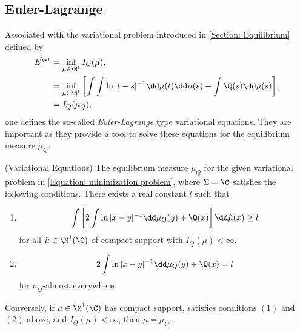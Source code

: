 \subsection{Euler-Lagrange}

Associated with the variational problem introduced in \autoref{Section: Equilibrium} defined by
\begin{align} \label{Equation: minimization problem}
	E^{\wf} & = \inf_{\mu \in \M^1} I_Q (\mu), \\
	& =   \inf_{\mu \in \M^1} \left[ \int \int \ln |t - s|^{-1} \dd \mu(t) \dd \mu(s) + \int \Q(s) \dd  \mu(s) \right], \\
	&  = I_Q (\mu_Q),
\end{align}
one defines the so-called \textit{Euler-Lagrange} type variational equations. They are important as they provide a tool to solve these equations for the equilibrium measure $\mu_Q$.

\begin{teorema} \label{Theorem: EL} (Variational Equations)
	The equilibrium measure $\mu_Q$ for the given variational problem in \eqref{Equation: minimization problem}, where $\Sigma = \C$ satisfies the following conditions. There exists a real constant $l$ such that 
	\begin{enumerate}
		\item
		\begin{equation}
			\int \left[ 2 \int \ln{|x-y|^{-1}} \dd \mu_Q(y) + \Q(x) \right] \dd \tilde{\mu}(x) \geq l
		\end{equation}
		for all $\tilde{\mu} \in \M^1(\C)$ of compact support with $I_Q(\tilde{\mu}) < \infty$.
		\item
		\begin{equation}
			2 \int \ln{|x-y|^{-1}} \dd \mu_Q(y) + \Q(x) = l
		\end{equation}
		for $\mu_Q$-almost everywhere.
	\end{enumerate}
	Conversely, if $\mu \in \M^1(\C)$ has compact support, satisfies conditions $(1)$ and $(2)$ above, and $I_Q(\mu) < \infty$, then $\mu = \mu_Q$.
\end{teorema}

